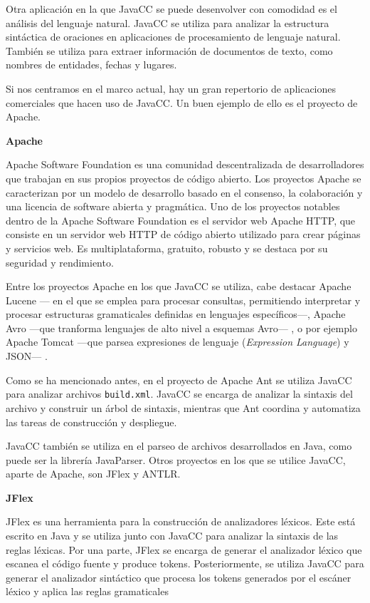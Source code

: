 Otra aplicación en la que JavaCC se puede desenvolver con comodidad es el análisis del lenguaje natural. JavaCC se utiliza para analizar la estructura sintáctica de oraciones en aplicaciones de procesamiento de lenguaje natural\cite{languageprocessing}. También se utiliza para extraer información de documentos de texto, como nombres de entidades, fechas y lugares. 	

Si nos centramos en el marco actual, hay un gran repertorio de aplicaciones comerciales que hacen uso de JavaCC. Un buen ejemplo de ello es el proyecto de Apache.

\textbf{Apache}

Apache Software Foundation es una comunidad descentralizada de desarrolladores que trabajan en sus propios proyectos de código abierto. Los proyectos Apache se caracterizan por un modelo de desarrollo basado en el consenso, la colaboración y una licencia de software abierta y pragmática\cite{apachepaginaoficial}. Uno de los proyectos notables dentro de la Apache Software Foundation es el servidor web Apache HTTP, que consiste en un servidor web HTTP de código abierto utilizado para crear páginas y servicios web. Es multiplataforma, gratuito, robusto y se destaca por su seguridad y rendimiento\cite{apachehttp}. 

Entre los proyectos Apache en los que JavaCC se utiliza, cabe destacar Apache Lucene --- en el que se emplea para procesar consultas, permitiendo interpretar y procesar estructuras gramaticales definidas en lenguajes específicos---, Apache Avro ---que tranforma lenguajes de alto nivel a esquemas Avro--- , o por ejemplo Apache Tomcat ---que parsea expresiones de lenguaje (\textit{Expression Language})\cite{expressionlanguage} y JSON--- \cite{javaccgithub}. 

Como se ha mencionado antes, en el proyecto de Apache Ant se utiliza JavaCC para analizar archivos \lstinline|build.xml|. JavaCC se encarga de analizar la sintaxis del archivo y construir un árbol de sintaxis, mientras que Ant coordina y automatiza las tareas de construcción y despliegue.

JavaCC también se utiliza en el parseo de archivos desarrollados en Java, como puede ser la librería JavaParser\cite{javaparser}. Otros proyectos en los que se utilice JavaCC, aparte de Apache, son JFlex y ANTLR.

\textbf{JFlex}

JFlex es una herramienta para la construcción de analizadores léxicos. Este está escrito en Java y se utiliza junto con JavaCC para analizar la sintaxis de las reglas léxicas. Por una parte, JFlex se encarga de generar el analizador léxico que escanea el código fuente y produce tokens. Posteriormente, se utiliza JavaCC para generar el analizador sintáctico que procesa los tokens generados por el escáner léxico y aplica las reglas gramaticales

